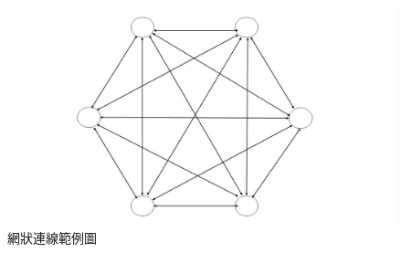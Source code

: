 \begin{figure}[H]
\centering
\includegraphics[scale=0.3]{images/6.jpg}
\caption{網狀連線範例圖}
\label{i:byz-latency}
\end{figure}